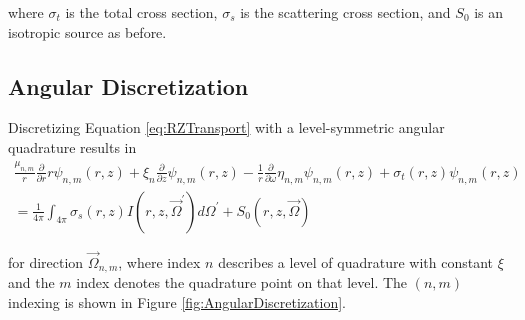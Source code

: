 \documentclass[12pt]{article}
\begin{document}
\noindent where $\sigma_t$ is the total cross section, $\sigma_s$ is the scattering cross section, and $S_0$ is an isotropic source as before.

\subsection{Angular Discretization}
Discretizing Equation \ref{eq:RZTransport} with a level-symmetric angular quadrature results in 
\begin{multline}
\frac{\mu_{n,m}}{r} \frac{\partial}{\partial r} r \psi_{n,m} \left(r,z \right) + \xi_n \frac{\partial}{\partial z} \psi_{n,m} \left(r,z \right) - \frac{1}{r} \frac{\partial}{\partial \omega} \eta_{n,m} \psi_{n,m} \left(r,z \right) + \sigma_t \left(r,z \right) \psi_{n,m} \left(r,z \right) \\
= \frac{1}{4 \pi} \int_{4 \pi} \sigma_s \left(r,z \right) I \left(r,z, \vec{\Omega}^\prime \right) d \Omega^\prime + S_0 \left(r,z, \vec{\Omega} \right)
\label{eq:RZSNTransport}
\end{multline}

\noindent for direction $\vec{\Omega}_{n,m}$, where index $n$ describes a level of quadrature with constant $\xi$ and the $m$ index denotes the quadrature point on that level. The $(n,m)$ indexing is shown in Figure \ref{fig:AngularDiscretization}.
\end{document}

